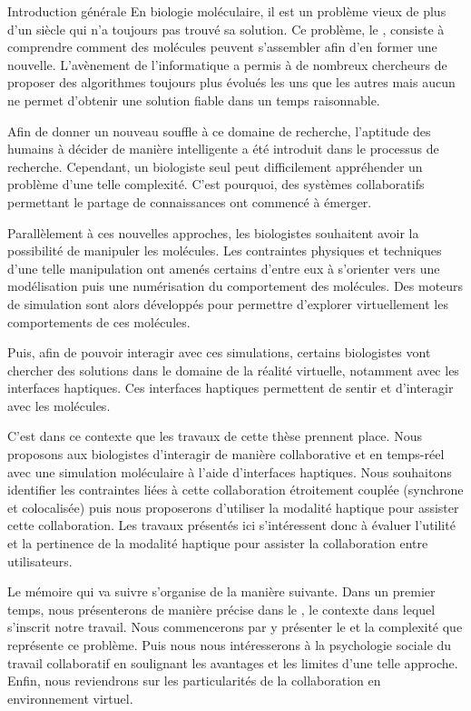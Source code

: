 \documentclass[myfrancais,ngerman,english,french]{mythesis}
\begin{document}
	\begin{mychapter+}{Introduction générale}
		En biologie moléculaire, il est un problème vieux de plus d'un siècle qui n'a toujours pas trouvé sa solution.
		Ce problème, le , consiste à comprendre comment des molécules peuvent s'assembler afin d'en former une nouvelle.
		L'avènement de l'informatique a permis à de nombreux chercheurs de proposer des algorithmes toujours plus évolués les uns que les autres mais aucun ne permet d'obtenir une solution fiable dans un temps raisonnable.

		Afin de donner un nouveau souffle à ce domaine de recherche, l'aptitude des humains à décider de manière intelligente a été introduit dans le processus de recherche.
		Cependant, un biologiste seul peut difficilement appréhender un problème d'une telle complexité.
		C'est pourquoi, des systèmes collaboratifs permettant le partage de connaissances ont commencé à émerger.

		Parallèlement à ces nouvelles approches, les biologistes souhaitent avoir la possibilité de manipuler les molécules.
		Les contraintes physiques et techniques d'une telle manipulation ont amenés certains d'entre eux à s'orienter vers une modélisation puis une numérisation du comportement des molécules.
		Des moteurs de simulation sont alors développés pour permettre d'explorer virtuellement les comportements de ces molécules.

		Puis, afin de pouvoir interagir avec ces simulations, certains biologistes vont chercher des solutions dans le domaine de la réalité virtuelle, notamment avec les interfaces haptiques.
		Ces interfaces haptiques permettent de sentir et d'interagir avec les molécules.

		C'est dans ce contexte que les travaux de cette thèse prennent place.
		Nous proposons aux biologistes d'interagir de manière collaborative et en temps-réel avec une simulation moléculaire à l'aide d'interfaces haptiques.
		Nous souhaitons identifier les contraintes liées à cette collaboration étroitement couplée (synchrone et colocalisée) puis nous proposerons d'utiliser la modalité haptique pour assister cette collaboration.
		Les travaux présentés ici s'intéressent donc à évaluer l'utilité et la pertinence de la modalité haptique pour assister la collaboration entre utilisateurs.

		Le mémoire qui va suivre s'organise de la manière suivante.
		Dans un premier temps, nous présenterons de manière précise dans le , le contexte dans lequel s'inscrit notre travail.
		Nous commencerons par y présenter le  et la complexité que représente ce problème.
		Puis nous nous intéresserons à la psychologie sociale du travail collaboratif en soulignant les avantages et les limites d'une telle approche.
		Enfin, nous reviendrons sur les particularités de la collaboration en environnement virtuel.


\end{mychapter+}
\end{document}

